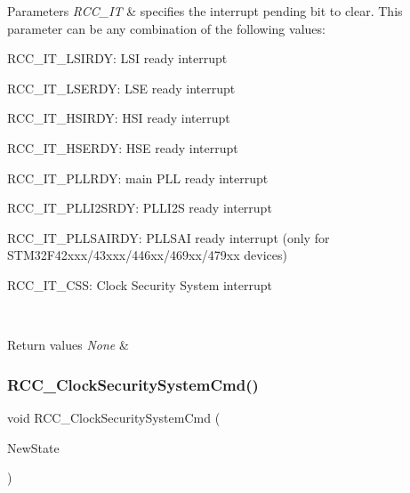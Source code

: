 \begin{DoxyParams}{Parameters}
{\em R\+C\+C\+\_\+\+IT} & specifies the interrupt pending bit to clear. This parameter can be any combination of the following values\+: \begin{DoxyItemize}
\item R\+C\+C\+\_\+\+I\+T\+\_\+\+L\+S\+I\+R\+DY\+: L\+SI ready interrupt \item R\+C\+C\+\_\+\+I\+T\+\_\+\+L\+S\+E\+R\+DY\+: L\+SE ready interrupt \item R\+C\+C\+\_\+\+I\+T\+\_\+\+H\+S\+I\+R\+DY\+: H\+SI ready interrupt \item R\+C\+C\+\_\+\+I\+T\+\_\+\+H\+S\+E\+R\+DY\+: H\+SE ready interrupt \item R\+C\+C\+\_\+\+I\+T\+\_\+\+P\+L\+L\+R\+DY\+: main P\+LL ready interrupt \item R\+C\+C\+\_\+\+I\+T\+\_\+\+P\+L\+L\+I2\+S\+R\+DY\+: P\+L\+L\+I2S ready interrupt ~\newline
 \item R\+C\+C\+\_\+\+I\+T\+\_\+\+P\+L\+L\+S\+A\+I\+R\+DY\+: P\+L\+L\+S\+AI ready interrupt (only for S\+T\+M32\+F42xxx/43xxx/446xx/469xx/479xx devices) \item R\+C\+C\+\_\+\+I\+T\+\_\+\+C\+SS\+: Clock Security System interrupt \end{DoxyItemize}
\\
\hline
\end{DoxyParams}

\begin{DoxyRetVals}{Return values}
{\em None} & \\
\hline
\end{DoxyRetVals}
\mbox{\label{group___r_c_c_ga0ff1fd7b9a8a49cdda11b7d7261c3494}} 
\subsubsection{\texorpdfstring{R\+C\+C\+\_\+\+Clock\+Security\+System\+Cmd()}{RCC\_ClockSecuritySystemCmd()}}
{\footnotesize\ttfamily void R\+C\+C\+\_\+\+Clock\+Security\+System\+Cmd (\begin{DoxyParamCaption}\item[{Functional\+State}]{New\+State }\end{DoxyParamCaption})}



